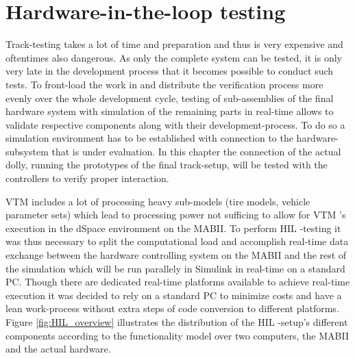 \documentclass[ExampleMasters.tex]{subfiles}
\begin{document}
	

\section{Hardware-in-the-loop testing}
\label{sec:HIL}

Track-testing takes a lot of time and preparation and thus is very expensive and oftentimes also dangerous. As only the complete system can be tested, it is only very late in the development process that it becomes possible to conduct such tests. To front-load the work in and distribute the verification process more evenly over the whole development cycle, testing of sub-assemblies of the final hardware system with simulation of the remaining parts in real-time allows to validate respective components along with their development-process. To do so a simulation environment has to be established with connection to the hardware-subsystem that is under evaluation. In this chapter the connection of the actual dolly, running the prototypes of the final track-setup, will be tested with the controllers to verify proper interaction.\cite{rapidcontrolprototyping}


\gls{VTM} includes a lot of processing heavy sub-models (tire models, vehicle parameter sets) which lead to processing power not sufficing to allow for \gls{VTM} 's execution in the dSpace environment on the \gls{MABII}. To perform \gls{HIL} -testing it was thus necessary to split the computational load and accomplish real-time data exchange between the hardware controlling system on the \gls{MABII} and the rest of the simulation which will be run parallely in Simulink in real-time on a standard PC. Though there are dedicated real-time platforms available to achieve real-time execution it was decided to rely on a standard PC to minimize costs and have a lean work-process without extra steps of code conversion to different platforms. Figure \ref{fig:HIL_overview} illustrates the distribution of the \gls{HIL} -setup's different components according to the functionality model over two computers, the \gls{MABII} and the actual hardware. 
\end{document}
